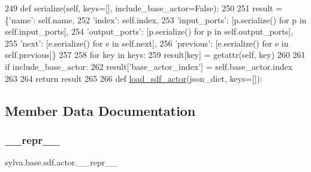 \begin{DoxyCode}
249         \textcolor{keyword}{def }serialize(self, keys=[], include\_base\_actor=False):
250 
251             result = \{\textcolor{stringliteral}{'name'}: self.name,
252                       \textcolor{stringliteral}{'index'}: self.index,
253                       \textcolor{stringliteral}{'input\_ports'}: [p.serialize() \textcolor{keywordflow}{for} p \textcolor{keywordflow}{in} self.input\_ports],
254                       \textcolor{stringliteral}{'output\_ports'}: [p.serialize() \textcolor{keywordflow}{for} p \textcolor{keywordflow}{in} self.output\_ports],
255                       \textcolor{stringliteral}{'next'}: [e.serialize() \textcolor{keywordflow}{for} e \textcolor{keywordflow}{in} self.next],
256                       \textcolor{stringliteral}{'previous'}: [e.serialize() \textcolor{keywordflow}{for} e \textcolor{keywordflow}{in} self.previous]\}
257 
258             \textcolor{keywordflow}{for} key \textcolor{keywordflow}{in} keys:
259                 result[key] = getattr(self, key)
260 
261             \textcolor{keywordflow}{if} include\_base\_actor:
262                 result[\textcolor{stringliteral}{'base\_actor\_index'}] = self.base\_actor.index
263 
264             \textcolor{keywordflow}{return} result
265 
266     \textcolor{keyword}{def }\hyperlink{namespacesylva_1_1base_1_1sdf_a14b2bfbb0fd81d1e114b670f13f718f1}{load\_sdf\_actor}(json\_dict, keys=[]):
\end{DoxyCode}


\subsection{Member Data Documentation}
\mbox{\label{classsylva_1_1base_1_1sdf_1_1actor_a3f5b51bf4c0ca79d2086bc8036b4651e}} 
\subsubsection{\texorpdfstring{\+\_\+\+\_\+repr\+\_\+\+\_\+}{\_\_repr\_\_}}
{\footnotesize\ttfamily sylva.\+base.\+sdf.\+actor.\+\_\+\+\_\+repr\+\_\+\+\_\+\hspace{0.3cm}{\ttfamily [private]}}



